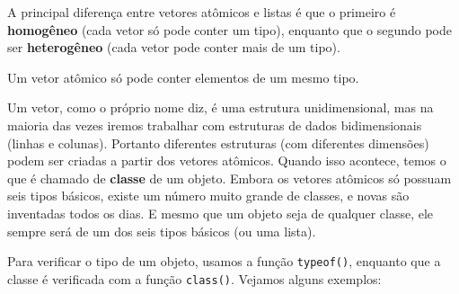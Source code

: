 \documentclass[
  10pt,
  a4paper]{book}
\begin{document}
A principal diferença entre vetores atômicos e listas é que o primeiro é
\textbf{homogêneo} (cada vetor só pode conter um tipo), enquanto que o
segundo pode ser \textbf{heterogêneo} (cada vetor pode conter mais de um
tipo).

Um vetor atômico só pode conter elementos de um mesmo tipo.

Um vetor, como o próprio nome diz, é uma estrutura unidimensional, mas
na maioria das vezes iremos trabalhar com estruturas de dados
bidimensionais (linhas e colunas). Portanto diferentes estruturas (com
diferentes dimensões) podem ser criadas a partir dos vetores atômicos.
Quando isso acontece, temos o que é chamado de \textbf{classe} de um objeto.
Embora os vetores atômicos só possuam seis tipos básicos, existe um
número muito grande de classes, e novas são inventadas todos os dias. E
mesmo que um objeto seja de qualquer classe, ele sempre será de um dos
seis tipos básicos (ou uma lista).

Para verificar o tipo de um objeto, usamos a função \texttt{typeof()}, enquanto
que a classe é verificada com a função \texttt{class()}. Vejamos alguns
exemplos:
\end{document}
